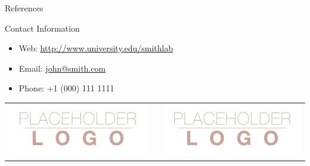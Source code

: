 \documentclass[final]{beamer}
\newlength{\onecolwid}
\begin{document}
\begin{frame}[t]
\begin{columns}[t]
\begin{column}{\onecolwid}

\begin{block}{References}

\nocite{*} %
\small{
\vspace{0.75in}}

\end{block}





\begin{alertblock}{Contact Information}

\begin{itemize}
\item Web: \href{http://www.university.edu/smithlab}{http://www.university.edu/smithlab}
\item Email: \href{mailto:john@smith.com}{john@smith.com}
\item Phone: +1 (000) 111 1111
\end{itemize}

\end{alertblock}

\begin{center}
\begin{tabular}{ccc}
\includegraphics[width=0.4\linewidth]{logo.png} & \hfill & \includegraphics[width=0.4\linewidth]{logo.png}
\end{tabular}
\end{center}


\end{column}
\end{columns}
\end{frame}
\end{document}
